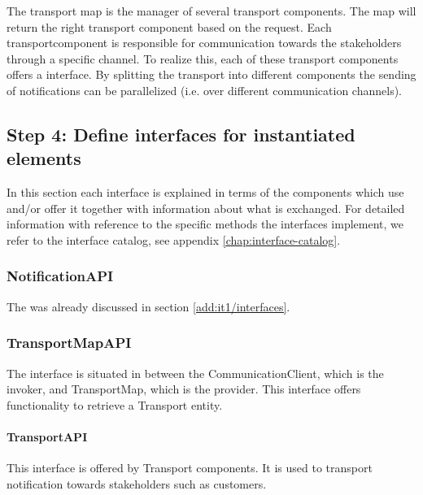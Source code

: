 \npar The transport map is the manager of several transport components. The
map will return the right transport component based on the request. Each
transportcomponent is responsible for communication towards the stakeholders
through a specific channel. To realize this, each of these transport components
offers a  interface. By splitting the transport into
different components the sending of notifications can be parallelized (i.e. over
different communication channels).

\subsection{Step 4: Define interfaces for instantiated elements}
\label{add:it8/interfaces}

\npar In this section each interface is explained in terms of the components
which use and/or offer it together with information about what is exchanged. For
detailed information with reference to the specific methods the interfaces
implement, we refer to the interface catalog, see appendix
\ref{chap:interface-catalog}.

\subsubsection{NotificationAPI}

\npar The  was already discussed in section
\ref{add:it1/interfaces}.

\subsubsection{TransportMapAPI}

\npar The  interface is situated in between the
CommunicationClient, which is the invoker, and TransportMap, which is the
provider. This interface offers functionality to retrieve a Transport entity.

\paragraph{TransportAPI}

\npar This interface is offered by Transport components. It is used to transport
notification towards stakeholders such as customers.

